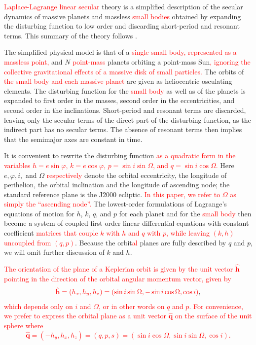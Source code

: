 \documentclass[a4paper,fleqn]{cas-sc}
\begin{document}
\begin{linenumbers}
\textcolor{red}{Laplace-Lagrange linear secular} theory is a simplified description of the secular dynamics of massive planets and massless \textcolor{red}{small bodies} obtained by expanding the disturbing function to low order and discarding short-period and resonant terms.
This summary of the theory follows \citet[chapter 7]{md99}.

The simplified physical model is that of a \textcolor{red}{single small body, represented as a massless point,} and $N$ \textcolor{red}{point-mass} planets orbiting a point-mass Sun\textcolor{red}{, ignoring the collective gravitational effects of a massive disk of small particles.}
The orbits of \textcolor{red}{the small body and each massive planet} are given as heliocentric osculating elements.
The disturbing function for the \textcolor{red}{small body} as well as of the planets is expanded to first order in the masses, second order in the eccentricities, and second order in the inclinations.
Short-period and resonant terms are discarded, leaving only the secular terms of the direct part of the disturbing function, as the indirect part has no secular terms.
The absence of resonant terms then implies that the semimajor axes are constant in time.

It is convenient to rewrite the disturbing function 
\textcolor{red}{as a quadratic form in the variables $h=e\sin{\varphi}$, $k=e\cos{\varphi}$, $p=\sin{i}\sin{\Omega}$, and $q=\sin{i}\cos{\Omega}$.}
Here $e,\varphi,i,$ and $\Omega$ \textcolor{red}{respectively} denote the orbital eccentricity, the longitude of perihelion, the orbital inclination and the longitude of ascending node; the standard reference plane is the J2000 ecliptic. 
\textcolor{red}{In this paper, we refer to $\Omega$ as simply the ``ascending node''.}
The lowest-order formulations of Lagrange's equations of motion for $h$, $k$, $q$, and $p$ for each planet and for the \textcolor{red}{small body} then become a system of coupled first order linear differential equations with constant coefficient \textcolor{red}{matrices that couple $k$ with $h$ and $q$ with $p$, while leaving $(k,h)$ uncoupled from $(q,p)$}.
Because the orbit\textcolor{red}{al} planes are fully described by $q$ and $p$, we will omit further discussion of $k$ and $h$.

\textcolor{red}{The orientation of the plane of a Keplerian orbit is given by the unit vector $\hat{\mathbf{h}}$ pointing in the direction of the orbital angular momentum vector, given by}
\begin{equation}
\label{e:hhat-vec}
\textcolor{red}{\hat{\mathbf{h}}=(h_x,h_y,h_z)=(\sin{i}\sin{\Omega},-\sin{i}\cos{\Omega},\cos{i})},
\end{equation}
\textcolor{red}{which depends only on $i$ and $\Omega$, or in other words on $q$ and $p$.
For convenience, we prefer to express the orbital plane as a unit vector $\hat{\mathbf{q}}$ on the surface of the unit sphere where
\begin{equation}
\label{e:qhat-vec}
\hat{\mathbf{q}}=(-h_y,h_x,h_z)=(q,p,s)=(\sin{i}\cos{\Omega},\sin{i}\sin{\Omega},\cos{i}).
\end{equation}
}


\end{linenumbers}
\end{document}
